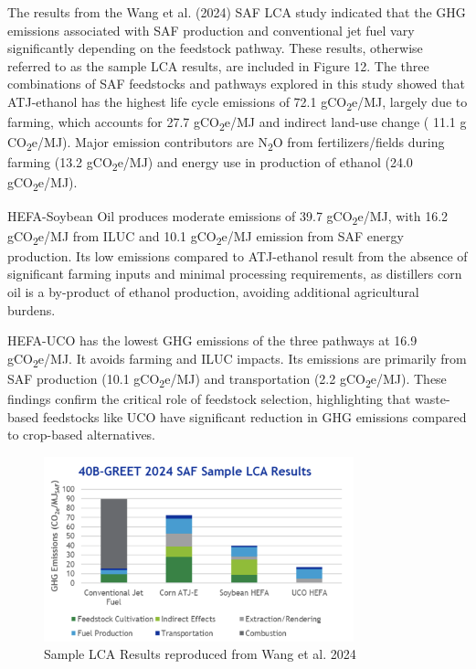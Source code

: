 \documentclass[12pt]{article}
\begin{document}
The results from the Wang et al. (2024) SAF LCA study indicated that the GHG emissions associated with SAF production and conventional jet fuel vary significantly depending on the feedstock pathway. These results, otherwise referred to as the sample LCA results, are included in Figure 12. The three combinations of SAF feedstocks and pathways explored in this study showed that ATJ-ethanol has the highest life cycle emissions of 72.1 gCO\textsubscript{2}e/MJ, largely due to farming, which accounts for 27.7 gCO\textsubscript{2}e/MJ and indirect land-use change ( 11.1 g CO\textsubscript{2}e/MJ). Major emission contributors are N\textsubscript{2}O from fertilizers/fields during farming (13.2 gCO\textsubscript{2}e/MJ) and energy use in production of ethanol (24.0 gCO\textsubscript{2}e/MJ).

HEFA-Soybean Oil produces moderate emissions of 39.7 gCO\textsubscript{2}e/MJ, with 16.2 gCO\textsubscript{2}e/MJ from ILUC and 10.1 gCO\textsubscript{2}e/MJ emission from SAF energy production. Its low emissions compared to ATJ-ethanol result from the absence of significant farming inputs and minimal processing requirements, as distillers corn oil is a by-product of ethanol production, avoiding additional agricultural burdens.

HEFA-UCO has the lowest GHG emissions of the three pathways at 16.9 gCO\textsubscript{2}e/MJ. It avoids farming and ILUC impacts. Its  emissions are primarily from SAF production (10.1 gCO\textsubscript{2}e/MJ) and transportation (2.2 gCO\textsubscript{2}e/MJ). These findings confirm the critical role of feedstock selection, highlighting that waste-based feedstocks like UCO have significant reduction in GHG emissions compared to crop-based alternatives.

\begin{figure}[H]
\centering
\includegraphics[width=0.8\textwidth]{samplelca.png} %
\caption{Sample LCA Results reproduced from Wang et al. 2024}
\label{fig:factors}
\end{figure}
\end{document}
